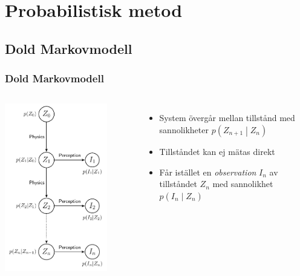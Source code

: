\documentclass[]{beamer}
\renewcommand{\ae}{\"{a}}
\renewcommand{\oe}{\"{o}}
\newcommand{\prob}[1]{p\left(#1\right)}
\newcommand{\cprob}[2]{\prob{\left. #1 \middle\vert #2 \right.}}
\newcommand{\cprobnext}[1]{\cprob{#1_{n+1}}{#1_n}}
\begin{document}
\section{Probabilistisk metod}

\subsection{Dold Markovmodell}
\begin{frame}
\frametitle{Dold Markovmodell}
  \begin{columns}[c]
    \column{2in}
    \includegraphics[width=0.8\textwidth]{hmm-graph.pdf}
    
    \column{2in}
    \begin{itemize}
    \item System \oe verg\aa r mellan tillst\aa nd med sannolikheter $\cprobnext{Z}$
    \item Tillst\aa ndet kan ej m\ae tas direkt
    \item F\aa r ist\ae llet en \emph{observation} $I_n$ av tillst\aa ndet $Z_n$ med sannolikhet $\cprob{I_n}{Z_n}$
    \end{itemize}
  \end{columns}
\end{frame}
\end{document}
